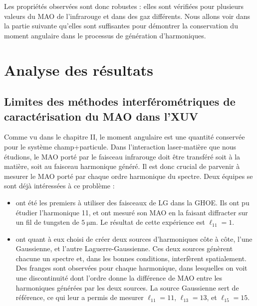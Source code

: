 Les propriétés observées sont donc robustes : elles sont vérifiées pour plusieurs valeurs du MAO de l'infrarouge et dans des gaz différents. Nous allons voir dans la partie suivante qu'elles sont suffisantes pour démontrer la conservation du moment angulaire dans le processus de génération d'harmoniques.

\chapter{Analyse des résultats}
\label{sec:OAM_analysis}
\section{Limites des méthodes interférométriques de caractérisation du MAO dans l'XUV}
Comme vu dans le chapitre II, le moment angulaire est une quantité conservée pour le système champ+particule. Dans l'interaction laser-matière que nous étudions, le MAO porté par le faisceau infrarouge doit être transféré soit à la matière, soit au faisceau harmonique généré. Il est donc crucial de parvenir à mesurer le MAO porté par chaque ordre harmonique du spectre. Deux équipes se sont déjà intéressées à ce problème :

\begin{itemize} 
\item {} ont été les premiers à utiliser des faisceaux de LG dans la GHOE. Ils ont pu étudier l'harmonique 11, et ont mesuré son MAO en la faisant diffracter sur un fil de tungsten de $\SI{5}{\micro\m}$. Le résultat de cette expérience est $\ell_{11}=1$.\\
\item {} ont quant à eux choisi de créer deux sources d'harmoniques côte à côte, l'une Gaussienne, et l'autre Laguerre-Gaussienne. Ces deux sources génèrent chacune un spectre et, dans les bonnes conditions, interfèrent spatialement. Des franges sont observées pour chaque harmonique, dans lesquelles on voit une discontinuité dont l'ordre donne la différence de MAO entre les harmoniques générées par les deux sources. La source Gaussienne sert de référence, ce qui leur a permis de mesurer $\ell_{11}=11$, $\ell_{13}=13$, et $\ell_{15}=15$.\\
\end{itemize}

